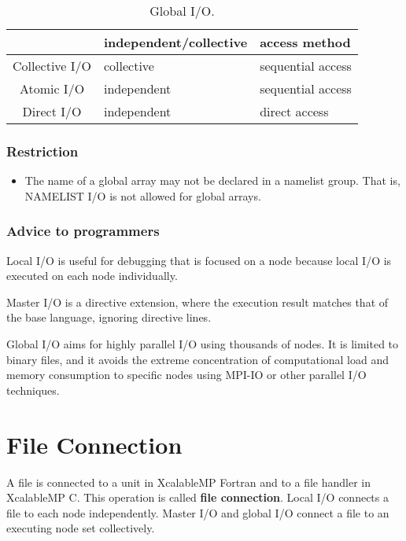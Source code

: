   \begin{table}[tb]
   \begin{center}
    \caption{Global I/O.}
    \label{tb:global}
    \begin{tabular}{|c||l|l|}
     \hline 
     & independent/collective & access method  \\ \hline \hline
     Collective I/O & collective & sequential access \\ \hline
     Atomic I/O & independent & sequential access \\ \hline
     Direct I/O & independent & direct access \\ \hline
    \end{tabular}
   \end{center}
  \end{table}
  
  \subsubsection*{Restriction}

  \begin{itemize}
   \item  The name of a global array may not be declared in a namelist
	  group.
	  That is, NAMELIST I/O is not allowed for global arrays.
  \end{itemize}

  \subsubsection*{Advice to programmers}

  Local I/O is useful for debugging that is focused on a node because
  local I/O is executed on each node individually.

  Master I/O is a directive extension, where the execution result
  matches that of the base language, ignoring directive lines.

  Global I/O aims for highly parallel I/O using thousands of nodes.
  It is limited to binary files, and it avoids the extreme concentration
  of computational load and memory consumption to specific nodes using
  MPI-IO or other parallel I/O techniques.

  \section{File Connection}

  A file is connected to a unit in XcalableMP Fortran and to a file
  handler in XcalableMP C.
  This operation is called {\bf file connection}.
  Local I/O connects a file to each node independently.
  Master I/O and global I/O connect a file to an executing node set
  collectively.
  
